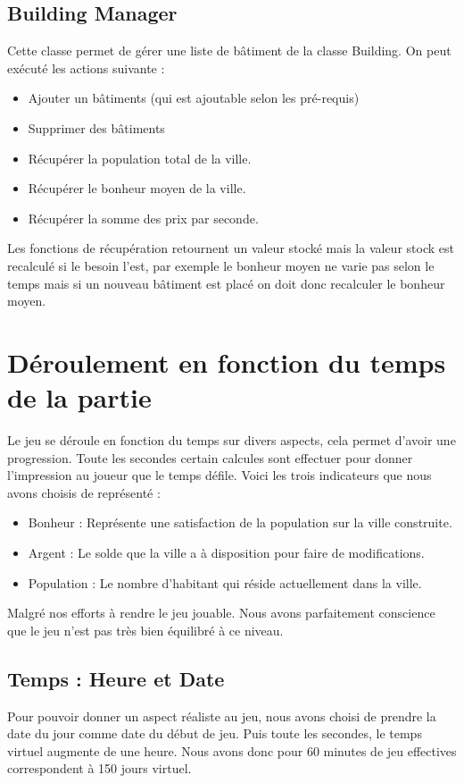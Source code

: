 \documentclass[a4paper,10pt,openany,oneside]{book}
\begin{document}
\subsection{Building Manager}
Cette classe permet de gérer une liste de bâtiment de la classe Building. On peut exécuté les actions suivante :
\begin{itemize}
	\item Ajouter un bâtiments (qui est ajoutable selon les pré-requis)
	\item Supprimer des bâtiments 
	\item Récupérer la population total de la ville.
	\item Récupérer le bonheur moyen de la ville.
	\item Récupérer la somme des prix par seconde.
\end{itemize}

Les fonctions de récupération retournent un valeur stocké mais la valeur stock est recalculé si le besoin l'est, par exemple le bonheur moyen ne varie pas selon le temps mais si un nouveau bâtiment est placé on doit donc recalculer le bonheur moyen.

\section{Déroulement en fonction du temps de la partie}
Le jeu se déroule en fonction du temps sur divers aspects, cela permet d'avoir une progression. Toute les secondes certain calcules sont effectuer pour donner l'impression au joueur que le temps défile. Voici les trois indicateurs que nous avons choisis de représenté :
\begin{itemize}
	\item Bonheur : Représente une satisfaction de la population sur la ville construite.
	\item Argent : Le solde que la ville a à disposition pour faire de modifications.
	\item Population : Le nombre d'habitant qui réside actuellement dans la ville.
\end{itemize}
Malgré nos efforts à rendre le jeu jouable. Nous avons parfaitement conscience que le jeu n'est pas très bien équilibré à ce niveau.
\subsection{Temps : Heure et Date}
Pour pouvoir donner un aspect réaliste au jeu, nous avons choisi de prendre la date du jour comme date du début de jeu. Puis toute les secondes, le temps virtuel augmente de une heure. Nous avons donc pour 60 minutes de jeu effectives correspondent à 150 jours virtuel.
\end{document}
